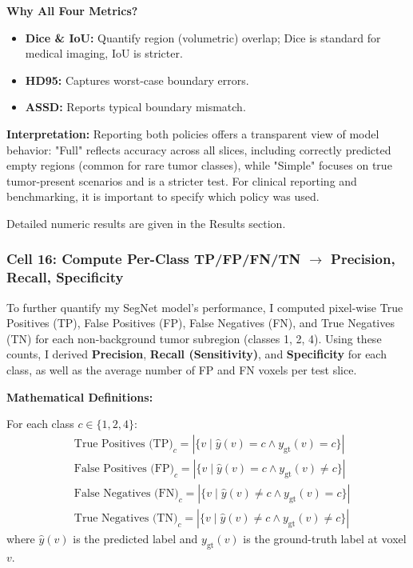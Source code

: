 \vspace{0.5em}
\noindent\textbf{Why All Four Metrics?}
\begin{itemize}
    \item \textbf{Dice \& IoU:} Quantify region (volumetric) overlap; Dice is standard for medical imaging, IoU is stricter.
    \item \textbf{HD95:} Captures worst-case boundary errors.
    \item \textbf{ASSD:} Reports typical boundary mismatch.
\end{itemize}

\vspace{0.5em}
\noindent\textbf{Interpretation:}
Reporting both policies offers a transparent view of model behavior: "Full" reflects accuracy across all slices, including correctly predicted empty regions (common for rare tumor classes), while "Simple" focuses on true tumor-present scenarios and is a stricter test. For clinical reporting and benchmarking, it is important to specify which policy was used.

Detailed numeric results are given in the Results section.

\subsubsection{Cell 16: Compute Per-Class TP/FP/FN/TN $\rightarrow$ Precision, Recall, Specificity}

To further quantify my SegNet model's performance, I computed pixel-wise True Positives (TP), False Positives (FP), False Negatives (FN), and True Negatives (TN) for each non-background tumor subregion (classes 1, 2, 4). Using these counts, I derived \textbf{Precision}, \textbf{Recall (Sensitivity)}, and \textbf{Specificity} for each class, as well as the average number of FP and FN voxels per test slice.

\vspace{1em}

\noindent
\textbf{Mathematical Definitions:}

For each class $c \in \{1,2,4\}$:
\begin{align*}
    &\text{True Positives (TP)}_c = \left|\{v \mid \hat{y}(v)=c \land y_\text{gt}(v)=c\}\right| \\
    &\text{False Positives (FP)}_c = \left|\{v \mid \hat{y}(v)=c \land y_\text{gt}(v)\neq c\}\right| \\
    &\text{False Negatives (FN)}_c = \left|\{v \mid \hat{y}(v)\neq c \land y_\text{gt}(v)=c\}\right| \\
    &\text{True Negatives (TN)}_c = \left|\{v \mid \hat{y}(v)\neq c \land y_\text{gt}(v)\neq c\}\right|
\end{align*}
where $\hat{y}(v)$ is the predicted label and $y_\text{gt}(v)$ is the ground-truth label at voxel $v$.

